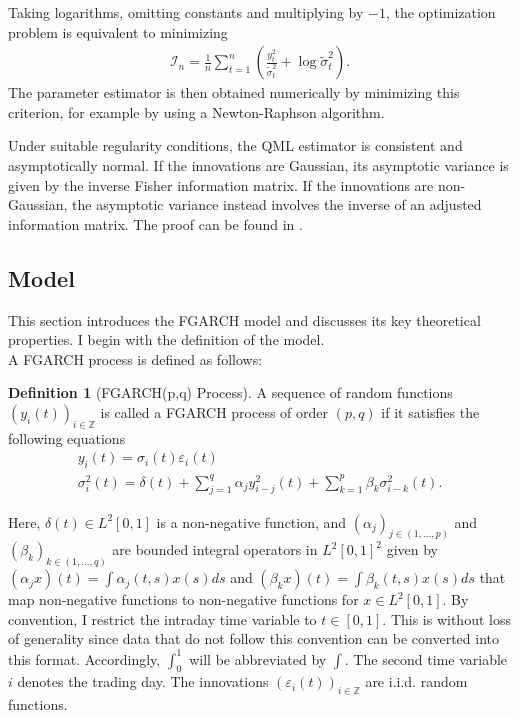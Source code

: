 \documentclass[12pt,a4paper]{article}
\theoremstyle{definition}
\newtheorem{definition}{Definition}[section]
\begin{document}
Taking logarithms, omitting constants and multiplying by $-1$, the optimization problem is equivalent to minimizing
\begin{gather}
    \mathcal{I}_n=\frac{1}{n}\sum_{t=1}^n\left( \frac{y_t^2}{\tilde{\sigma}_t^2}+\log \tilde{\sigma}_t^2\right).
\end{gather}
The parameter estimator is then obtained numerically by minimizing this criterion, for example by using a Newton-Raphson algorithm.

Under suitable regularity conditions, the QML estimator is consistent and asymptotically normal. If the innovations are Gaussian, its asymptotic variance is given by the inverse Fisher information matrix. If the innovations are non-Gaussian, the asymptotic variance instead involves the inverse of an adjusted information matrix. The proof can be found in \citet{francq2019garch}.
\subsection{Model}
\label{subsec:FGARCHModel}
This section introduces the FGARCH model and discusses its key theoretical properties. I begin with the definition of the model.\\
A FGARCH process is defined as follows:
\begin{definition}[FGARCH(p,q) Process]
\label{fGARCHpq}
A sequence of random functions $(y_i(t))_{i\in \mathbb{Z}}$ is called a FGARCH process of order $(p,q)$ if it satisfies the following equations
    \begin{gather}
        y_i(t) = \sigma_i(t)\varepsilon_i(t)\\
        \sigma_i^2(t) = \delta(t)+\sum_{j=1}^q\alpha_jy_{i-j}^2(t)+\sum_{k=1}^p\beta_k\sigma_{i-k}^2(t).
    \end{gather}
\end{definition}
Here, $\delta(t)\in L^2[0,1]$ is a non-negative function, and $(\alpha_j)_{j\in (1,...,p)}$ and $(\beta_k)_{k \in (1,...,q)}$ are bounded integral operators in $L^2[0,1]^2$ given by $(\alpha_jx)(t)=\int \alpha_j(t,s)x(s)ds$ and $(\beta_kx)(t)=\int \beta_k(t,s)x(s)ds$ that map non-negative functions to non-negative functions for $x\in L^2[0,1]$. By convention, I restrict the intraday time variable to $t\in[0,1]$. This is without loss of generality since data that do not follow this convention can be converted into this format. Accordingly, $\int_0^1$ will be abbreviated by $\int$. The second time variable $i$ denotes the trading day. The innovations $(\varepsilon_i(t))_{i\in\mathbb{Z}}$ are i.i.d. random functions.
\end{document}
